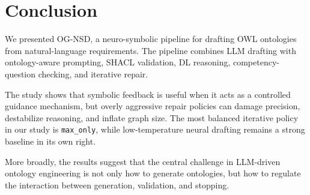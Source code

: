\section{Conclusion}

We presented OG-NSD, a neuro-symbolic pipeline for drafting OWL ontologies from natural-language requirements. The pipeline combines LLM drafting with ontology-aware prompting, SHACL validation, DL reasoning, competency-question checking, and iterative repair.

The study shows that symbolic feedback is useful when it acts as a controlled guidance mechanism, but overly aggressive repair policies can damage precision, destabilize reasoning, and inflate graph size. The most balanced iterative policy in our study is \texttt{max\_only}, while low-temperature neural drafting remains a strong baseline in its own right.

More broadly, the results suggest that the central challenge in LLM-driven ontology engineering is not only how to generate ontologies, but how to regulate the interaction between generation, validation, and stopping.
